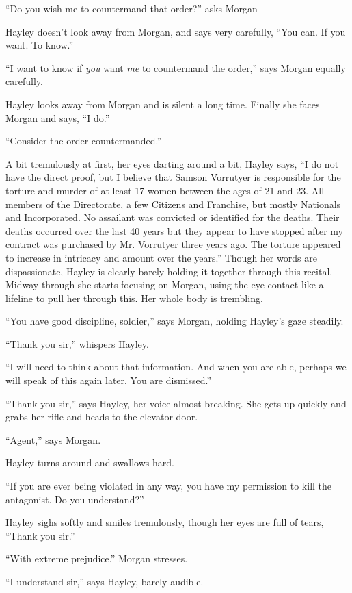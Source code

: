 ``Do you wish me to countermand that order?'' asks Morgan

Hayley doesn't look away from Morgan, and says very carefully, ``You can.  If you want. To know.''

``I want to know if \textit{you} want \textit{me} to countermand the order,'' says Morgan equally carefully.

Hayley looks away from Morgan and is silent a long time.  Finally she faces Morgan and says, ``I do.''

``Consider the order countermanded.''

A bit tremulously at first, her eyes darting around a bit, Hayley says, ``I do not have the direct proof, but I believe that Samson Vorrutyer is responsible for the torture and murder of at least 17 women between the ages of 21 and 23.  All members of the Directorate, a few Citizens and Franchise, but mostly Nationals and Incorporated.  No assailant was convicted or identified for the deaths.  Their deaths occurred over the last 40 years but they appear to have stopped after my contract was purchased by Mr. Vorrutyer three years ago.  The torture appeared to increase in intricacy and amount over the years.''  Though her words are dispassionate, Hayley is clearly barely holding it together through this recital.  Midway through she starts focusing on Morgan, using the eye contact like a lifeline to pull her through this.  Her whole body is trembling.

``You have good discipline, soldier,'' says Morgan, holding Hayley's gaze steadily.

``Thank you sir,'' whispers Hayley.

``I will need to think about that information.  And when you are able, perhaps we will speak of this again later.  You are dismissed.''

``Thank you sir,'' says Hayley, her voice almost breaking.  She gets up quickly and grabs her rifle and heads to the elevator door.

``Agent,'' says Morgan. 

Hayley turns around and swallows hard.

``If you are ever being violated in any way, you have my permission to kill the antagonist.  Do you understand?''

Hayley sighs softly and smiles tremulously, though her eyes are full of tears, ``Thank you sir.''

``With extreme prejudice.'' Morgan stresses.

``I understand sir,'' says Hayley, barely audible.

